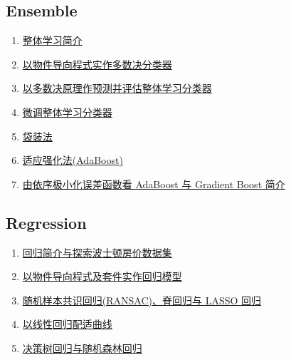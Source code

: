 \documentclass[11pt]{article}
\begin{document}
\subsection*{Ensemble}

\vspace{-0.25cm}

\begin{multicols}{2}
	\begin{enumerate}
		\item \href{https://mp.weixin.qq.com/s/7NRpVfdjBBIh7qF8qFi2AQ}{整体学习简介}	%
		\item \href{https://mp.weixin.qq.com/s/QUzndlMD9Wl23Rd3Sc8iug}{以物件导向程式实作多数决分类器}	%
		\item \href{https://mp.weixin.qq.com/s/IaRbx7QxIzEEBH3ID2rc8A}{\small 以多数决原理作预测并评估整体学习分类器}	%
		\item \href{https://mp.weixin.qq.com/s/-5E7Lvn7PuaaYj1CI8O5QA}{微调整体学习分类器}	%
		\item \href{https://mp.weixin.qq.com/s/5Te6DwvwIBHYLrETL_qptw}{袋装法}	%
		\item \href{https://mp.weixin.qq.com/s/cYmRobzrStZeGHfWSHVQ8A}{适应强化法(AdaBoost)}	%
		\item \href{https://mp.weixin.qq.com/s/sW7u7yxH7VmwPhldUTkPBw}{\small 由依序极小化误差函数看 AdaBoost 与 Gradient Boost 简介}	%
	\end{enumerate}
\end{multicols}


\subsection*{Regression}

\vspace{-0.25cm}

\begin{multicols}{2}
	\begin{enumerate}
		\item \href{https://mp.weixin.qq.com/s/PoEkNO3lEYsCjVagLeMwEw}{回归简介与探索波士顿房价数据集}	%
		\item \href{https://mp.weixin.qq.com/s/bgiSRysxTaVLD60NoS6JuQ}{以物件导向程式及套件实作回归模型}	%
		\item \href{https://mp.weixin.qq.com/s/WEpou9qEp-ZYEgwKK--Qpg}{\small 随机样本共识回归(RANSAC)、脊回归与 LASSO 回归}	%
		\item \href{https://mp.weixin.qq.com/s/n4goxLw73phLZIJgnpxpfA}{以线性回归配适曲线}	%
		\item \href{https://mp.weixin.qq.com/s/NmWmFuMIYwiLQcnSck-omg}{决策树回归与随机森林回归}	%
	\end{enumerate}
\end{multicols}
\end{document}
